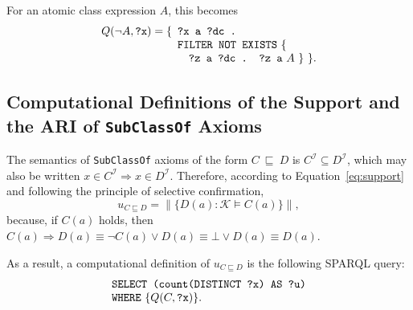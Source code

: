 \documentclass{sig-alternate}
\begin{document}
For an atomic class expression $A$, this becomes
\begin{equation}
Q(\neg A, \mbox{\tt ?x}) =
  \begin{minipage}[t]{3in}
    \begin{tabbing}
      \quad\=\quad\=\quad\=\kill
      \{\>\texttt{?x a ?dc .}\\
        \>\texttt{FILTER NOT EXISTS} \{\\
        \>\>\texttt{?z a ?dc . ?z a} $A$ \} \}.
    \end{tabbing}
  \end{minipage}
\end{equation}


\subsection{Computational Definitions of the Support and the ARI of \texttt{SubClassOf} Axioms}
\label{comp-def-content}

The semantics of \texttt{SubClassOf} axioms of the form $C~\sqsubseteq~D$ is $C^\mathcal{I} \subseteq D^\mathcal{I}$,
which may also be written $x \in C^\mathcal{I} \Rightarrow x \in D^\mathcal{I}$.
Therefore, according to Equation~\ref{eq:support} and
following the principle of selective confirmation,
\begin{equation}
  u_{C \sqsubseteq D} = \| \{D(a) : \mathcal{K} \models C(a) \} \|,
\end{equation}
because, if $C(a)$ holds, then $C(a) \Rightarrow D(a) \equiv \neg C(a) \lor D(a) \equiv \bot \lor D(a) \equiv D(a)$.

\noindent
As a result, a computational definition of $u_{C \sqsubseteq D}$ is the following SPARQL query:
\begin{equation}\label{eq:query-refc}
  \begin{minipage}[c]{5in}
    \begin{tabbing}
      \quad\=\quad\=\quad\=\kill
      \texttt{SELECT (count(DISTINCT ?x) AS ?u)}\\
      \texttt{WHERE} \{$Q(C, \mbox{\tt ?x})$\}.
    \end{tabbing}
  \end{minipage}
\end{equation}
\end{document}
